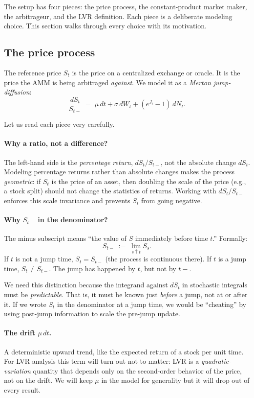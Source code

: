 \documentclass[11pt]{article}
\theoremstyle{definition}
\theoremstyle{remark}
\newcommand{\1}{\mathbf{1}}
\begin{document}
The setup has four pieces: the price process, the constant-product market maker, the arbitrageur, and the LVR definition. Each piece is a deliberate modeling choice. This section walks through every choice with its motivation.

\subsection{The price process}

The reference price $S_t$ is the price on a centralized exchange or oracle. It is the price the AMM is being arbitraged \emph{against}. We model it as a \emph{Merton jump-diffusion}:
\begin{equation}\label{eq:sde}
\frac{dS_t}{S_{t-}} \;=\; \mu\,dt + \sigma\,dW_t + (e^{J_t} - 1)\,dN_t.
\end{equation}

Let us read each piece very carefully.

\paragraph{Why a ratio, not a difference?}
The left-hand side is the \emph{percentage return}, $dS_t / S_{t-}$, not the absolute change $dS_t$. Modeling percentage returns rather than absolute changes makes the process \emph{geometric}: if $S_t$ is the price of an asset, then doubling the scale of the price (e.g., a stock split) should not change the statistics of returns. Working with $dS_t / S_{t-}$ enforces this scale invariance and prevents $S_t$ from going negative.

\paragraph{Why $S_{t-}$ in the denominator?}
The minus subscript means ``the value of $S$ immediately before time $t$.'' Formally:
\[
S_{t-} \;:=\; \lim_{s \uparrow t} S_s.
\]
If $t$ is not a jump time, $S_t = S_{t-}$ (the process is continuous there). If $t$ is a jump time, $S_t \neq S_{t-}$. The jump has happened by $t$, but not by $t-$.

We need this distinction because the integrand against $dS_t$ in stochastic integrals must be \emph{predictable}. That is, it must be known just \emph{before} a jump, not at or after it. If we wrote $S_t$ in the denominator at a jump time, we would be ``cheating'' by using post-jump information to scale the pre-jump update.

\paragraph{The drift $\mu\,dt$.} A deterministic upward trend, like the expected return of a stock per unit time. For LVR analysis this term will turn out not to matter: LVR is a \emph{quadratic-variation} quantity that depends only on the second-order behavior of the price, not on the drift. We will keep $\mu$ in the model for generality but it will drop out of every result.
\end{document}
